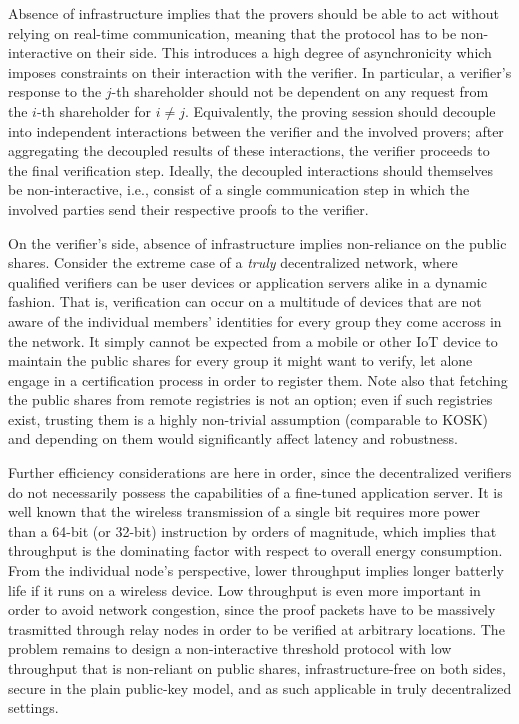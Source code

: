\documentclass[10pt, psamsfonts, reqno]{amsart}
\theoremstyle{definition}
\theoremstyle{remark}
\numberwithin{equation}{section}
\begin{document}
Absence of infrastructure implies that
the provers should be able to
act without relying on real-time communication,
meaning that the protocol has to be
non-interactive on their side.
This introduces a high degree of asynchronicity
which imposes constraints on their interaction
with the verifier.
In particular, a verifier's response
to the $j$-th shareholder should not be dependent
on any request from the $i$-th shareholder for $i \neq j$.
Equivalently, the proving session should decouple into
independent interactions between the verifier
and the involved provers; after aggregating
the decoupled results of these interactions, the verifier
proceeds to the final verification step.
Ideally, the decoupled interactions should themselves be
non-interactive, i.e., consist of a single communication
step in which the involved parties send their respective
proofs to the verifier.

On the verifier's side, absence of infrastructure
implies non-reliance on the public shares.
Consider the extreme case of a
\textit{truly} decentralized network,
where qualified verifiers can be user devices
or application servers alike in a dynamic fashion.
That is, verification can occur
on a multitude of devices that are not aware
of the individual members' identities for every group
they come accross in the network.
It simply cannot be expected from a mobile or other IoT device
to maintain the public shares for every group
it might want to verify,
let alone engage in a certification process
in order to register them.
Note also that fetching the public shares
from remote registries is not an option;
even if such registries exist,
trusting them is a highly non-trivial assumption
(comparable to KOSK)
and depending on them would significantly affect
latency and robustness.

Further efficiency considerations are here in order,
since the decentralized verifiers do not necessarily possess
the capabilities of a fine-tuned application server.
It is well known that the wireless transmission
of a single bit requires more power
than a 64-bit (or 32-bit) instruction by orders of magnitude,
which implies that throughput is
the dominating factor with respect to overall energy consumption.
From the individual node's perspective,
lower throughput implies longer batterly life
if it runs on a wireless device.
Low throughput is even more important
in order to avoid network congestion,
since the proof packets have to be massively trasmitted
through relay nodes
in order to be verified at arbitrary locations.
The problem remains to
design a non-interactive threshold protocol
with low throughput that is
non-reliant on public shares, infrastructure-free
on both sides, secure in the plain public-key model,
and as such applicable in truly decentralized settings.
\end{document}
